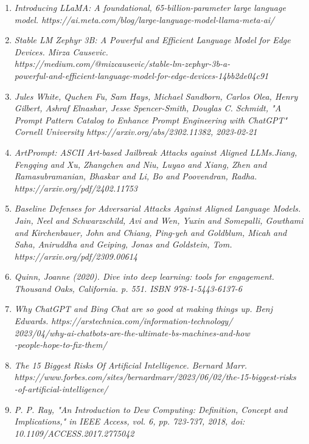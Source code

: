 \begin{enumerate}
\item {\textit {Introducing LLaMA: A foundational, 65-billion-parameter large language model. https://ai.meta.com/blog/large-language-model-llama-meta-ai/}}
\item {\textit {Stable LM Zephyr 3B: A Powerful and Efficient Language Model for Edge Devices. Mirza Causevic. \\ https://medium.com/@mizcausevic/stable-lm-zephyr-3b-a-\\powerful-and-efficient-language-model-for-edge-devices-14bb2de04c91}}
\item {\textit {Jules White, Quchen Fu, Sam Hays, Michael Sandborn, Carlos Olea, Henry Gilbert, Ashraf Elnashar, Jesse Spencer-Smith, Douglas C. Schmidt, "A Prompt Pattern Catalog to Enhance Prompt Engineering with ChatGPT" Cornell University https://arxiv.org/abs/2302.11382, 2023-02-21}}
\item {\textit {ArtPrompt: ASCII Art-based Jailbreak Attacks against Aligned LLMs.Jiang, Fengqing and Xu, Zhangchen and Niu, Luyao and Xiang, Zhen and Ramasubramanian, Bhaskar and Li, Bo and Poovendran, Radha. \\ https://arxiv.org/pdf/2402.11753 }}
\item {\textit {Baseline Defenses for Adversarial Attacks Against Aligned Language Models. Jain, Neel and Schwarzschild, Avi and Wen, Yuxin and Somepalli, Gowthami and Kirchenbauer, John and Chiang, Ping-yeh and Goldblum, Micah and Saha, Aniruddha and Geiping, Jonas and Goldstein, Tom. https://arxiv.org/pdf/2309.00614}}
\item {\textit {Quinn, Joanne (2020). Dive into deep learning: tools for engagement. Thousand Oaks, California. p. 551. ISBN 978-1-5443-6137-6}}
\item {\textit {Why ChatGPT and Bing Chat are so good at making things up. Benj Edwards. https://arstechnica.com/information-technology/\\2023/04/why-ai-chatbots-are-the-ultimate-bs-machines-and-how\\-people-hope-to-fix-them/}}
\item {\textit {The 15 Biggest Risks Of Artificial Intelligence. Bernard Marr. \\ https://www.forbes.com/sites/bernardmarr/2023/06/02/the-15-biggest-risks\\-of-artificial-intelligence/}}
\item {\textit {P. P. Ray, "An Introduction to Dew Computing: Definition, Concept and Implications," in IEEE Access, vol. 6, pp. 723-737, 2018, doi: 10.1109/ACCESS.2017.2775042}}

\end{enumerate}
